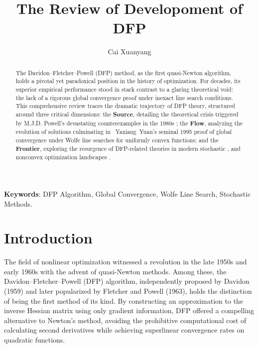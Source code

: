 \documentclass[12pt,a4paper]{article}  %
\title{The Review of Developoment of DFP}
\date{\DTMnow}
\author{Cai Xuanyang}
\newcounter{cite}
\theoremstyle{definition}
\numberwithin{equation}{section}
\begin{document}
\maketitle

\begin{abstract}
The Davidon--Fletcher--Powell (DFP) method, as the first quasi-Newton algorithm, holds a pivotal yet paradoxical position in the history of optimization. For decades, its superior empirical performance stood in stark contrast to a glaring theoretical void: the lack of a rigorous global convergence proof under inexact line search conditions. This comprehensive review traces the dramatic trajectory of DFP theory, structured around three critical dimensions: the \textbf{Source}, detailing the theoretical crisis triggered by M.J.D. Powell's devastating counterexamples in the 1980s \cite{powell1984,powell1986}; the \textbf{Flow}, analyzing the evolution of solutions culminating in ~\mbox{Yaxiang Yuan's} seminal 1995 proof \cite{yuan1995} of global convergence under Wolfe line searches for uniformly convex functions; and the \textbf{Frontier}, exploring the resurgence of DFP-related theories in modern stochastic \cite{byrd2016,moritz2016}, and nonconvex optimization landscapes \cite{li2001}. 
\end{abstract}

\textbf{Keywords}: DFP Algorithm, Global Convergence, Wolfe Line Search, Stochastic Methods.

\newpage
\tableofcontents
\newpage

\section{Introduction}
\label{sec:intro}

The field of nonlinear optimization witnessed a revolution in the late 1950s and early 1960s with the advent of quasi-Newton methods. Among these, the Davidon--Fletcher--Powell (DFP) algorithm, independently proposed by Davidon (1959) and later popularized by Fletcher and Powell (1963), holds the distinction of being the first method of its kind. By constructing an approximation to the inverse Hessian matrix using only gradient information, DFP offered a compelling alternative to Newton's method, avoiding the prohibitive computational cost of calculating second derivatives while achieving superlinear convergence rates on quadratic functions.
\end{document}
